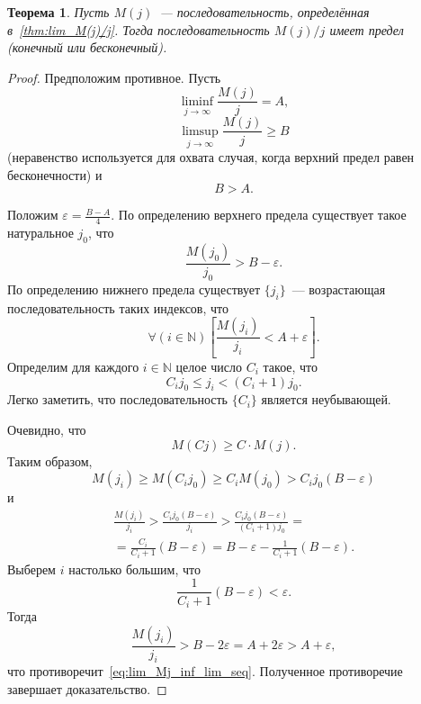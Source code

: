 \documentclass[a4paper,14pt]{article} %
\theoremstyle{plain}
\newtheorem{theorem}[lemma]{Теорема}
\begin{document}
\begin{theorem}
	Пусть $M(j)$~--- последовательность, определённая в~\eqref{thm:lim_M(j)/j}.
	Тогда последовательность $M(j)/j$ имеет предел (конечный или бесконечный).
\end{theorem}

\begin{proof}
	Предположим противное.
	Пусть
	\begin{equation}
		\liminf_{j\to\infty}\frac{M(j)}{j} = A,
	\end{equation}
	\begin{equation}
		\limsup_{j\to\infty}\frac{M(j)}{j} \geq B
	\end{equation}
	(неравенство используется для охвата случая, когда верхний предел равен бесконечности)
	и
	\begin{equation}
		B > A
		.
	\end{equation}

	Положим $\varepsilon = \frac{B-A}{4}$.
	По определению верхнего предела существует такое натуральное $j_0$,
	что
	\begin{equation}
		\frac{M(j_0)}{j_0} > B - \varepsilon
		.
	\end{equation}
	По определению нижнего предела существует $\{j_i\}$~--- возрастающая последовательность таких индексов, что
	\begin{equation}
		\label{eq:lim_Mj_inf_lim_seq}
		\forall(i\in\mathbb{N})\left[ \frac{M(j_i)}{j_i} < A + \varepsilon \right]
		.
	\end{equation}
	Определим для каждого $i\in\mathbb{N}$ целое число $C_i$ такое, что
	\begin{equation}
		\label{eq:lim_Mj_inf_lim_Ci}
		C_i j_0 \leq j_i < (C_i+1)j_0
		.
	\end{equation}
	Легко заметить, что последовательность $\{C_i\}$ является неубывающей.

	Очевидно, что
	\begin{equation}
		M(Cj) \geq C \cdot M(j)
		.
	\end{equation}
	Таким образом,
	\begin{equation}
		M(j_i) \geq M(C_i j_0) \geq C_i M(j_0) > C_i j_0 (B-\varepsilon)
	\end{equation}
	и
	\begin{multline}
		\frac{M(j_i)}{j_i} > \frac{C_i j_0 (B-\varepsilon)}{j_i}
		> \frac{C_i j_0 (B-\varepsilon)}{(C_i+1)j_0}
		=
		\\=
		\frac{C_i}{C_i+1}(B-\varepsilon)
		= B-\varepsilon - \frac{1}{C_i+1}(B-\varepsilon)
		.
	\end{multline}
	Выберем $i$ настолько большим, что
	\begin{equation}
		\frac{1}{C_i+1}(B-\varepsilon) < \varepsilon
		.
	\end{equation}
	Тогда
	\begin{equation}
		\frac{M(j_i)}{j_i} > B - 2 \varepsilon = A + 2 \varepsilon > A + \varepsilon
		,
	\end{equation}
	что противоречит~\eqref{eq:lim_Mj_inf_lim_seq}.
	Полученное противоречие завершает доказательство.
\end{proof}
\end{document}
